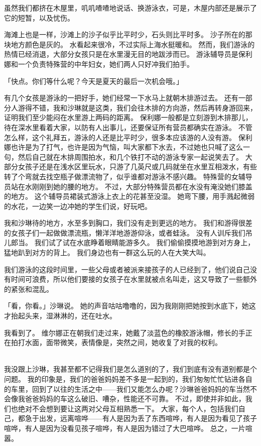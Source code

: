 \documentclass[UTF8]{ctexart}
\begin{document}
虽然我们都挤在木屋里，叽叽喳喳地说话、换游泳衣，可是，木屋内部还是展示了它的短暂，以及忧伤。

海滩上也是一样，沙滩上的沙子似乎比平时少，石头则比平时多。
沙子所在的那块地方颜色是灰的。
水看起来很冷，不过实际上海水挺暖和。
然而，我们游泳的热情已经消退，大部分女孩只是在水里漫无目的地跋涉而已。
游泳辅导员是保利娜和一个负责特殊营的中年妇女，她们两人只好冲我们拍手。

「快点。你们等什么呢？今天是夏天的最后一次机会哦。」

有几个女孩是游泳的一把好手，她们经常一下水马上就朝木排游过去。
还有一部分人游得不错，我和沙琳就是这类，我们会往木排的方向游，然后再转身游回来，证明我们至少能闷在水里游上两码的距离。
保利娜一般都是立刻游到木排那儿，待在深水里看着大家，以防有人出事儿，还要保证所有营员都确实在游泳。
不管怎么样，这个礼拜五，游泳的人还是比平时少，很多本应该游的人没有游。
保利娜也许是为了打气，也许是因为气恼，叫大家都下水去，不过她也只喊了这么一句，然后自己就在木排周围拍水，和几个铁打不动的游泳专家一起说笑去了。
大部分女孩子还是在浅水区里玩水，只游了几英尺或几码就坐在水里互相泼水，有些转了个弯就去找空瓶子做漂流物了，似乎谁都对游泳不感兴趣。
特殊营的女辅导员站在水刚刚到她的腰的地方。
不过，大部分特殊营员都在水没有淹没她们膝盖的地方。
这个辅导员裙装式游泳上衣上的花甚至没湿。
她弯下腰，用手溅起微弱的水花，一边笑一边冲她的学生们说，好玩吧。

我和沙琳待的地方，水至多到胸口，我们没有走到更远的地方。
我们和游得很差的女孩子们一起做做漂流瓶，懒洋洋地游游仰泳，或者蛙泳。
没有人训斥我们吊儿郎当。
我们试了试在水底睁着眼睛能游多久。
我们偷偷摸摸地游到对方身上，猛地趴到对方的背上。
我们身边也有一群这么玩的人在大笑大叫。

我们游泳的这段时间里，一些父母或者被派来接孩子的人已经到了，他们说自己没有时间可浪费，所以他们要接的女孩子在水里就被点名叫走，这又导致了一些额外的紧张和混乱。

「看，你看。」沙琳说。
她的声音咕咕噜噜的，因为我刚刚把她按到水底下，她这才抬起头来，湿淋淋的，还在吐水。

我看到了。
维尔娜正在朝我们走过来，她戴了淡蓝色的橡胶游泳帽，修长的手正在拍打水面，面带微笑，表情像是，突然之间，她收复了对我的权利。

~\\

我没跟上沙琳，我甚至都不记得我们是怎么道别的了，我们到底有没有道别都是个问题。
我的印象是，我们的爸爸妈妈差不多是一起到的，我们匆匆忙忙钻进各自的车里，回到了以往的生活之中——我们又能怎么办呢？沙琳爸爸妈妈的车当然不会像我爸爸妈妈的车这么破旧、嘈杂，性能还不可靠。
不过，即使并非如此，我们也绝对不会想到要让这两对父母互相熟悉一下。
大家，每个人，包括我们自己，都急于出发，远离喧哗——有人是因为丢了东西喧哗，有人是因为看见了孩子喧哗，有人是因为没看见孩子喧哗，有人是因为错过了大巴喧哗。
总之，一片喧嚣。
\end{document}

